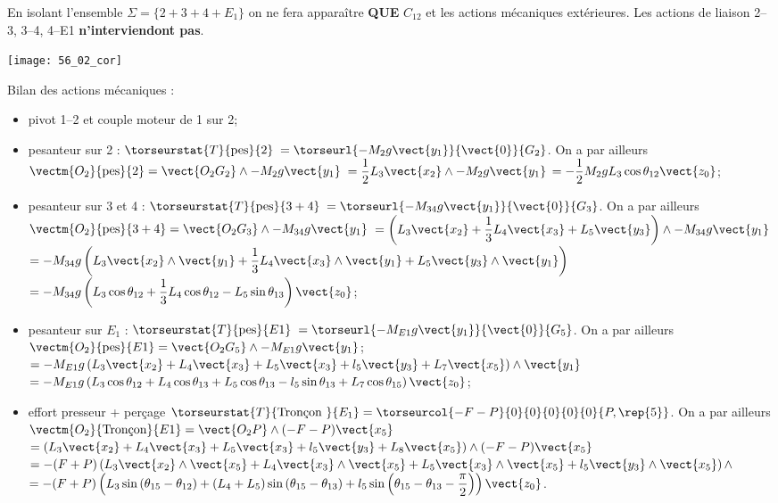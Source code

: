 \ifprof
En isolant l'ensemble $\Sigma = \{2+3+4+E_1\}$ on ne fera apparaître \textbf{QUE} $C_{12}$ et les actions mécaniques extérieures. Les actions de liaison 2--3, 3--4, 4--E1 \textbf{n'interviendont pas}. 
\else
\fi

\ifprof
\begin{center}
\texttt{[image: 56\_02\_cor]}
\end{center}
Bilan des actions mécaniques :
\begin{itemize}
\item pivot 1--2  et couple moteur de 1 sur 2;

\item pesanteur sur 2 : $\torseurstat{T}{\text{pes}}{2}$ $=\torseurl{-M_2g \vect{y_1} }{\vect{0}}{G_2}$.
On a par ailleurs $\vectm{O_2}{\text{pes}}{2} = \vect{O_2 G_2} \wedge-M_2g \vect{y_1}$
$= \dfrac{1}{2}L_3\vect{x_2} \wedge-M_2g \vect{y_1}$
$= -\dfrac{1}{2}M_2gL_3 \cos \theta_{12} \vect{z_0} $;

\item pesanteur sur 3 et 4 : $\torseurstat{T}{\text{pes}}{3+4}$ $=\torseurl{-M_{34} g \vect{y_1} }{\vect{0}}{G_3}$.
On a par ailleurs $\vectm{O_2}{\text{pes}}{3+4} = \vect{O_2 G_3} \wedge-M_{34}g \vect{y_1}$
$= \left( L_3\vect{x_2} +\dfrac{1}{3}L_4\vect{x_3}+L_5\vect{y_3}\right) \wedge-M_{34}g \vect{y_1}$
$= -M_{34}g\left( L_3\vect{x_2}\wedge \vect{y_1} +\dfrac{1}{3}L_4\vect{x_3}\wedge \vect{y_1}+L_5\vect{y_3}\wedge \vect{y_1} \right) $
$= -M_{34}g\left( L_3\cos\theta_{12} +\dfrac{1}{3}L_4\cos\theta_{12}-L_5\sin\theta_{13}\right) \vect{z_0}$;

\item pesanteur sur $E_1$ : $\torseurstat{T}{\text{pes}}{E1}$ $=\torseurl{-M_{E1} g \vect{y_1} }{\vect{0}}{G_5}$.
On a par ailleurs $\vectm{O_2}{\text{pes}}{E1} = \vect{O_2 G_5} \wedge-M_{E1}g \vect{y_1}$;
$= -M_{E1}g\left( L_3 \vect{x_2}+L_4\vect{x_3}+L_5 \vect{x_3}+l_5 \vect{y_3}+L_7 \vect{x_5} \right)\wedge \vect{y_1}$
$= -M_{E1}g\left( L_3 \cos\theta_{12}+L_4\cos\theta_{13}+L_5 \cos\theta_{13}-l_5 \sin\theta_{13}+L_7 \cos\theta_{15}\right) \vect{z_0}$;


\item effort presseur + perçage $\torseurstat{T}{\text{Tronçon }}{E_1}=\torseurcol{-F-P}{0}{0}{0}{0}{0}{P, \rep{5}}$.
On a par ailleurs $\vectm{O_2}{\text{Tronçon}}{E1} = \vect{O_2 P} \wedge(-F-P) \vect{x_5}$
$= \left(  L_3 \vect{x_2}+L_4\vect{x_3}+L_5 \vect{x_3}+l_5 \vect{y_3}+L_8 \vect{x_5} \right)\wedge(-F-P) \vect{x_5}$
$= -(F+P)\left(  L_3 \vect{x_2}\wedge \vect{x_5}+L_4\vect{x_3}\wedge \vect{x_5}+L_5 \vect{x_3}\wedge \vect{x_5}+l_5 \vect{y_3}\wedge \vect{x_5} \right)\wedge $
$= -(F+P)\left(  L_3 \sin\left(\theta_{15}-\theta_{12} \right)+ \left(L_4+L_5\right)\sin\left(\theta_{15}-\theta_{13} \right)+l_5 \sin\left(\theta_{15}-\theta_{13} -\dfrac{\pi}{2} \right)  \right)\vect{z_0}$.
\end{itemize}
\else
\fi

